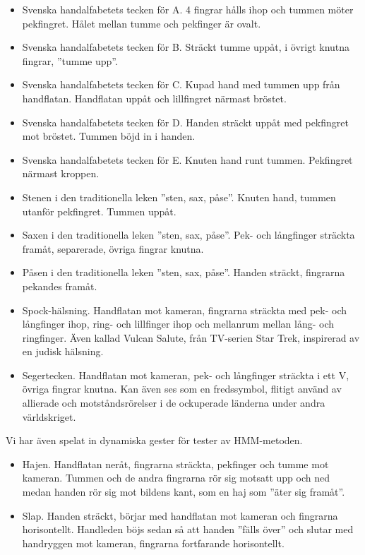 \documentclass[../rapport_MVEX01-11-05]{subfiles}
\begin{document}
\begin{itemize}
 	\item Svenska handalfabetets tecken för A. 4 fingrar hålls ihop och tummen
  möter pekfingret. Hålet mellan tumme och pekfinger är ovalt.

  \item Svenska handalfabetets tecken för B. Sträckt tumme uppåt, i övrigt knutna fingrar, ''tumme upp''.

  \item Svenska handalfabetets tecken för C. Kupad hand med tummen upp från handflatan. Handflatan uppåt
  och lillfingret närmast bröstet. 

  \item Svenska handalfabetets tecken för D. Handen sträckt uppåt med pekfingret mot bröstet. Tummen böjd
  in i handen.

  \item Svenska handalfabetets tecken för E. Knuten hand runt tummen. Pekfingret närmast kroppen. 

  \item Stenen i den traditionella leken ''sten, sax, påse''. Knuten hand, tummen utanför pekfingret. Tummen uppåt.

  \item Saxen i den traditionella leken ''sten, sax, påse''. Pek- och långfinger sträckta framåt, separerade, övriga
  fingrar knutna.

  \item Påsen i den traditionella leken ''sten, sax, påse''. Handen sträckt, fingrarna pekandes framåt.

  \item Spock-hälsning. Handflatan mot kameran, fingrarna sträckta med pek- och
  långfinger ihop, ring- och lillfinger ihop och mellanrum mellan
  lång- och ringfinger. Även kallad Vulcan Salute, från TV-serien Star
  Trek, inspirerad av en judisk hälsning.

  \item Segertecken. Handflatan mot kameran, pek- och långfinger sträckta i
  ett V, övriga fingrar knutna. Kan även ses som en fredssymbol,
  flitigt använd av allierade och motståndsrörelser i de ockuperade
  länderna under andra världskriget.
\end{itemize}

Vi har även spelat in dynamiska gester för tester av HMM-metoden.
\begin{itemize}
\item Hajen. Handflatan neråt, fingrarna sträckta, pekfinger och tumme
  mot kameran. Tummen och de andra fingrarna rör sig motsatt upp och
  ned medan handen rör sig mot bildens kant, som en haj som ''äter sig
  framåt''.
\item Slap. Handen sträckt, börjar med handflatan mot kameran och
  fingrarna horisontellt. Handleden böjs sedan så att handen ''fälls
  över'' och slutar med handryggen mot kameran, fingrarna fortfarande
  horisontellt. 
\end{itemize}
\end{document}
